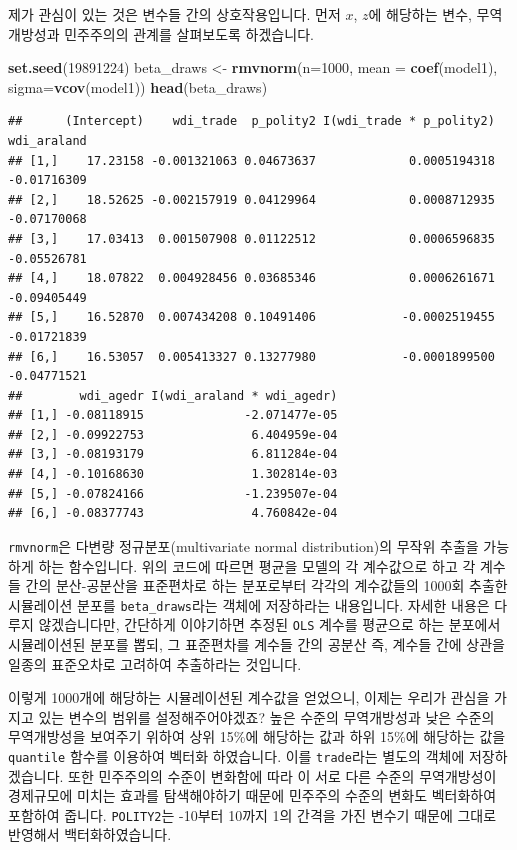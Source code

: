 \documentclass[
]{book}
\newenvironment{Shaded}{\begin{snugshade}}{\end{snugshade}}
\newcommand{\DataTypeTok}[1]{\textcolor[rgb]{0.13,0.29,0.53}{#1}}
\newcommand{\DecValTok}[1]{\textcolor[rgb]{0.00,0.00,0.81}{#1}}
\newcommand{\KeywordTok}[1]{\textcolor[rgb]{0.13,0.29,0.53}{\textbf{#1}}}
\newcommand{\NormalTok}[1]{#1}
\newcommand{\StringTok}[1]{\textcolor[rgb]{0.31,0.60,0.02}{#1}}
\begin{document}
제가 관심이 있는 것은 변수들 간의 상호작용입니다. 먼저 \(x\), \(z\)에 해당하는 변수, 무역개방성과 민주주의의 관계를 살펴보도록 하겠습니다.

\begin{Shaded}
\begin{Highlighting}[]
\KeywordTok{set.seed}\NormalTok{(}\DecValTok{19891224}\NormalTok{)}
\NormalTok{beta_draws <-}\StringTok{ }\KeywordTok{rmvnorm}\NormalTok{(}\DataTypeTok{n=}\DecValTok{1000}\NormalTok{, }\DataTypeTok{mean =} \KeywordTok{coef}\NormalTok{(model1), }\DataTypeTok{sigma=}\KeywordTok{vcov}\NormalTok{(model1))}
\KeywordTok{head}\NormalTok{(beta_draws)}
\end{Highlighting}
\end{Shaded}

\begin{verbatim}
##      (Intercept)    wdi_trade  p_polity2 I(wdi_trade * p_polity2) wdi_araland
## [1,]    17.23158 -0.001321063 0.04673637             0.0005194318 -0.01716309
## [2,]    18.52625 -0.002157919 0.04129964             0.0008712935 -0.07170068
## [3,]    17.03413  0.001507908 0.01122512             0.0006596835 -0.05526781
## [4,]    18.07822  0.004928456 0.03685346             0.0006261671 -0.09405449
## [5,]    16.52870  0.007434208 0.10491406            -0.0002519455 -0.01721839
## [6,]    16.53057  0.005413327 0.13277980            -0.0001899500 -0.04771521
##        wdi_agedr I(wdi_araland * wdi_agedr)
## [1,] -0.08118915              -2.071477e-05
## [2,] -0.09922753               6.404959e-04
## [3,] -0.08193179               6.811284e-04
## [4,] -0.10168630               1.302814e-03
## [5,] -0.07824166              -1.239507e-04
## [6,] -0.08377743               4.760842e-04
\end{verbatim}

\texttt{rmvnorm}은 다변량 정규분포(multivariate normal distribution)의 무작위 추출을 가능하게 하는 함수입니다. 위의 코드에 따르면 평균을 모델의 각 계수값으로 하고 각 계수들 간의 분산-공분산을 표준편차로 하는 분포로부터 각각의 계수값들의 1000회 추출한 시뮬레이션 분포를 \texttt{beta\_draws}라는 객체에 저장하라는 내용입니다. 자세한 내용은 다루지 않겠습니다만, 간단하게 이야기하면 추정된 \texttt{OLS} 계수를 평균으로 하는 분포에서 시뮬레이션된 분포를 뽑되, 그 표준편차를 계수들 간의 공분산 즉, 계수들 간에 상관을 일종의 표준오차로 고려하여 추출하라는 것입니다.

이렇게 1000개에 해당하는 시뮬레이션된 계수값을 얻었으니, 이제는 우리가 관심을 가지고 있는 변수의 범위를 설정해주어야겠죠? 높은 수준의 무역개방성과 낮은 수준의 무역개방성을 보여주기 위하여 상위 15\%에 해당하는 값과 하위 15\%에 해당하는 값을 \texttt{quantile} 함수를 이용하여 벡터화 하였습니다. 이를 \texttt{trade}라는 별도의 객체에 저장하겠습니다. 또한 민주주의의 수준이 변화함에 따라 이 서로 다른 수준의 무역개방성이 경제규모에 미치는 효과를 탐색해야하기 때문에 민주주의 수준의 변화도 벡터화하여 포함하여 줍니다. \texttt{POLITY2}는 -10부터 10까지 1의 간격을 가진 변수기 때문에 그대로 반영해서 백터화하였습니다.
\end{document}
